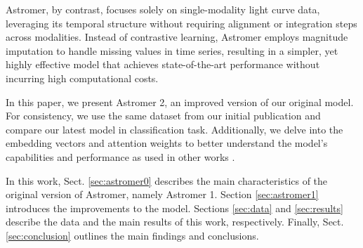 Astromer, by contrast, focuses solely on single-modality light curve data, leveraging its temporal structure without requiring alignment or integration steps across modalities. Instead of contrastive learning, Astromer employs magnitude imputation to handle missing values in time series, resulting in a simpler, yet highly effective model that achieves state-of-the-art performance without incurring high computational costs.

In this paper, we present Astromer 2, an improved version of our original model. For consistency, we use the same dataset from our initial publication and compare our latest model in classification task. Additionally, we delve into the embedding vectors and attention weights to better understand the model’s capabilities and performance as used in other works \citep{10.1093/mnras/stab2588}.

In this work, Sect. \ref{sec:astromer0} describes the main characteristics of the original version of Astromer, namely Astromer 1. Section \ref{sec:astromer1} introduces the improvements to the model. Sections \ref{sec:data} and \ref{sec:results} describe the data and the main results of this work, respectively. Finally, Sect. \ref{sec:conclusion} outlines the main findings and conclusions.